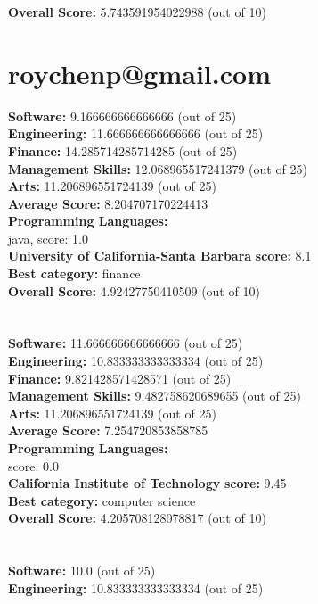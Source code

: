 \documentclass{article}
\begin{document}
\textbf{Overall Score: }5.743591954022988 (out of 10)\section{roychenp@gmail.com}
\textbf{Software:} 9.166666666666666 (out of 25)\\
\textbf{Engineering: } 11.666666666666666 (out of 25)\\
\textbf{Finance:} 14.285714285714285 (out of 25)\\
\textbf{Management Skills:} 12.068965517241379 (out of 25)\\
\textbf{Arts:} 11.206896551724139 (out of 25)\\
\textbf{Average Score: } 8.204707170224413\\
\textbf{Programming Languages:} \\
java, score: 1.0\\
\textbf{University of California-Santa Barbara} \textbf{score:} 8.1\\
\textbf{Best category: } finance\\
\textbf{Overall Score: }4.92427750410509 (out of 10)\section{}
\textbf{Software:} 11.666666666666666 (out of 25)\\
\textbf{Engineering: } 10.833333333333334 (out of 25)\\
\textbf{Finance:} 9.821428571428571 (out of 25)\\
\textbf{Management Skills:} 9.482758620689655 (out of 25)\\
\textbf{Arts:} 11.206896551724139 (out of 25)\\
\textbf{Average Score: } 7.254720853858785\\
\textbf{Programming Languages:} \\
score: 0.0\\
\textbf{California Institute of Technology} \textbf{score:} 9.45\\
\textbf{Best category: } computer science\\
\textbf{Overall Score: }4.205708128078817 (out of 10)\section{}
\textbf{Software:} 10.0 (out of 25)\\
\textbf{Engineering: } 10.833333333333334 (out of 25)\\
\end{document}
